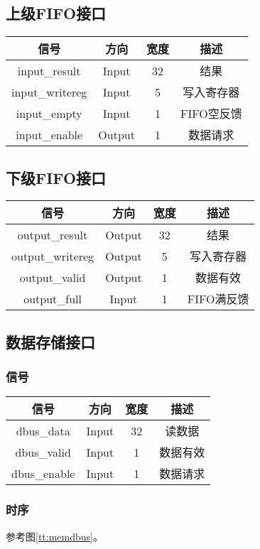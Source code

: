 \documentclass{article}
\newenvironment{signals}{
	\begin{center}
		\begin{tabular}{| c | c | c | c |}
			\hline
			信号 & 方向 & 宽度 & 描述 \\ \hline
}{
		\end{tabular}
	\end{center}
}
\newcommand\sigin{Input}
\newcommand\sigout{Output}
\begin{document}
\subsection{上级FIFO接口}

\begin{signals}
	input\_result & \sigin & 32 & 结果 \\ \hline
	input\_writereg & \sigin & 5 & 写入寄存器 \\ \hline
	input\_empty & \sigin & 1 & FIFO空反馈 \\ \hline
	input\_enable & \sigout & 1 & 数据请求 \\ \hline
\end{signals}

\subsection{下级FIFO接口}

\begin{signals}
	output\_result & \sigout & 32 & 结果 \\ \hline
	output\_writereg & \sigout & 5 & 写入寄存器 \\ \hline
	output\_valid & \sigout & 1 & 数据有效 \\ \hline
	output\_full & \sigin & 1 & FIFO满反馈 \\ \hline
\end{signals}

\subsection{数据存储接口}

\subsubsection{信号}

\begin{signals}
	dbus\_data & \sigin & 32 & 读数据 \\ \hline
	dbus\_valid & \sigin & 1 & 数据有效 \\ \hline
	dbus\_enable & \sigin & 1 & 数据请求 \\ \hline
\end{signals}

\subsubsection{时序}

参考图\ref{tt:memdbus}。
\end{document}
